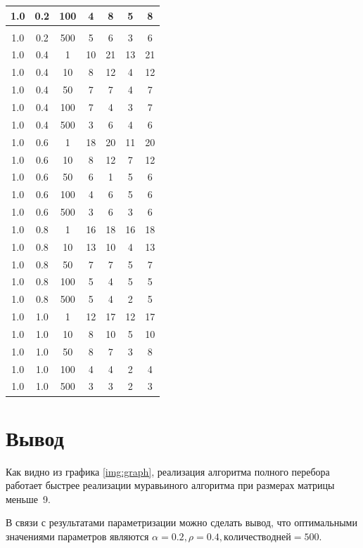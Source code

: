 \begin{longtable}{|c|c|c|c|c|c|c|}
	1.0 &  0.2 &  100 &     4 &     8 &     5 &     8 \\
	\hline
	\pagebreak
	\multicolumn{7}{l}{\textit{Продолжение таблицы}}\\
	\hline
	1.0 &  0.2 &  500 &     5 &     6 &     3 &     6 \\ \hline
	1.0 &  0.4 &    1 &    10 &    21 &    13 &    21 \\
	1.0 &  0.4 &   10 &     8 &    12 &     4 &    12 \\
	1.0 &  0.4 &   50 &     7 &     7 &     4 &     7 \\
	1.0 &  0.4 &  100 &     7 &     4 &     3 &     7 \\
	1.0 &  0.4 &  500 &     3 &     6 &     4 &     6 \\ \hline
	1.0 &  0.6 &    1 &    18 &    20 &    11 &    20 \\
	1.0 &  0.6 &   10 &     8 &    12 &     7 &    12 \\
	1.0 &  0.6 &   50 &     6 &     1 &     5 &     6 \\
	1.0 &  0.6 &  100 &     4 &     6 &     5 &     6 \\
	1.0 &  0.6 &  500 &     3 &     6 &     3 &     6 \\ \hline
	1.0 &  0.8 &    1 &    16 &    18 &    16 &    18 \\
	1.0 &  0.8 &   10 &    13 &    10 &     4 &    13 \\
	1.0 &  0.8 &   50 &     7 &     7 &     5 &     7 \\
	1.0 &  0.8 &  100 &     5 &     4 &     5 &     5 \\
	1.0 &  0.8 &  500 &     5 &     4 &     2 &     5 \\ \hline
	1.0 &  1.0 &    1 &    12 &    17 &    12 &    17 \\
	1.0 &  1.0 &   10 &     8 &    10 &     5 &    10 \\
	1.0 &  1.0 &   50 &     8 &     7 &     3 &     8 \\
	1.0 &  1.0 &  100 &     4 &     4 &     2 &     4 \\
	1.0 &  1.0 &  500 &     3 &     3 &     2 &     3 \\ \hline
	
\end{longtable}


\section{Вывод}

Как видно из графика \ref{img:graph}, реализация алгоритма полного перебора работает быстрее реализации муравьиного алгоритма при размерах матрицы меньше~9.

В связи с результатами параметризации можно сделать вывод, что оптимальными значениями параметров являются $\alpha = 0.2, \rho = 0.4, количество дней = 500$.